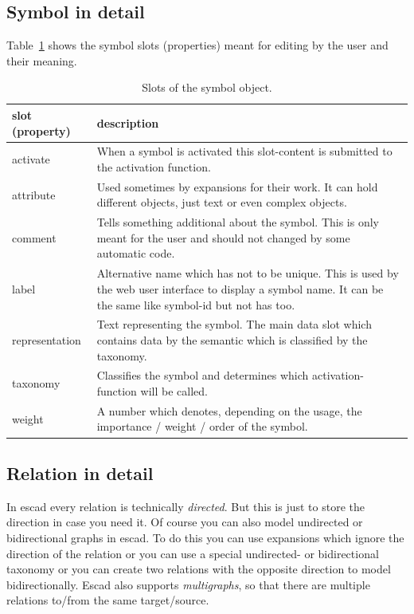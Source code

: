 \documentclass[a4paper, 12pt, openany]{scrbook}
\begin{document}
\subsection{Symbol in detail}
Table~\ref{tab:symbol} shows the symbol slots (properties) meant for editing by the user and their meaning.
\begin{table}[htbp]
\centering
\begin{tabular}{|p{4cm}|p{12cm}|}
  \hline
  \textbf{slot (property)} & \textbf{description} \\
  \hline
  activate & When a symbol is activated this slot-content is submitted to the activation function. \\
  \hline
  attribute & Used sometimes by expansions for their work. It can hold different objects, just text or even complex objects. \\
  \hline
  comment & Tells something additional about the symbol. This is only meant for the user and should not changed by some automatic code. \\
  \hline
  label & Alternative name which has not to be unique. This is used by the web user interface to display a symbol name. It can be the same like symbol-id but not has too. \\
  \hline
  representation & Text representing the symbol. The main data slot which contains data by the semantic which is classified by the taxonomy. \\
  \hline
  taxonomy & Classifies the symbol and determines which activation-function will be called. \\
  \hline
  weight & A number which denotes, depending on the usage, the importance / weight / order of the symbol. \\
  \hline
\end{tabular}
\caption{Slots of the symbol object.}
\label{tab:symbol}
\end{table}
\subsection{Relation in detail}
In escad every relation is technically \emph{directed}. But this is just to store the direction in case you need it. Of course you can also model undirected or bidirectional graphs in escad. To do this you can use expansions which ignore the direction of the relation or you can use a special undirected- or bidirectional taxonomy or you can create two relations with the opposite direction to model bidirectionally. Escad also supports \emph{multigraphs}, so that there are multiple relations to/from the same target/source.
\end{document}
